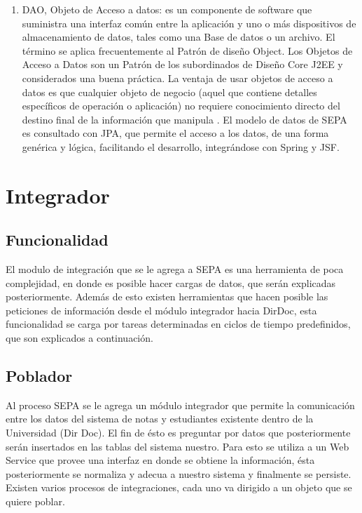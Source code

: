 \documentclass[a4paper,12pt,openany,oneside]{book}
\begin{document}
\begin{enumerate}
\item DAO, Objeto de Acceso a datos: es un componente de software que suministra una interfaz común entre la aplicación y uno o más dispositivos de almacenamiento de datos, tales como una Base de datos o un archivo. El término se aplica frecuentemente al Patrón de diseño Object. Los Objetos de Acceso a Datos son un Patrón de los subordinados de Diseño Core J2EE y considerados una buena práctica. La ventaja de usar objetos de acceso a datos es que cualquier objeto de negocio (aquel que contiene detalles específicos de operación o aplicación) no requiere conocimiento directo del destino final de la información que manipula \cite{data25}. El modelo de datos de SEPA es consultado con JPA, que permite el acceso a los datos, de una forma genérica y lógica, facilitando el desarrollo, integrándose con Spring y JSF.

\end{enumerate}

\chapter{Integrador}
\thispagestyle{empty}
\section{Funcionalidad}

El modulo de integración que se le agrega a SEPA es una herramienta de poca complejidad, en donde es posible hacer cargas de datos, que serán explicadas posteriormente. Además de esto existen herramientas que hacen posible las peticiones de información desde el módulo integrador hacia DirDoc, esta funcionalidad se carga por tareas determinadas en ciclos de tiempo predefinidos, que son explicados a continuación.

\section{Poblador}
Al proceso SEPA se le agrega un módulo integrador que permite la comunicación entre los datos del sistema de notas y estudiantes existente dentro de la Universidad (Dir Doc). El fin de ésto es preguntar por datos que posteriormente serán insertados en las tablas del sistema nuestro. Para esto se utiliza a un Web Service que provee una interfaz en donde se obtiene la información, ésta posteriormente se normaliza y adecua a nuestro sistema y finalmente se persiste. Existen varios procesos de integraciones, cada uno va dirigido a un objeto que se quiere poblar.
\end{document}
